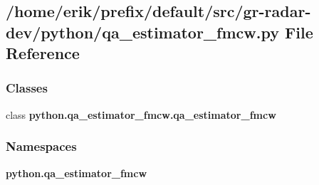 \subsection{/home/erik/prefix/default/src/gr-\/radar-\/dev/python/qa\+\_\+estimator\+\_\+fmcw.py File Reference}
\label{qa__estimator__fmcw_8py}
\subsubsection*{Classes}
\begin{DoxyCompactItemize}
\item 
class {\bf python.\+qa\+\_\+estimator\+\_\+fmcw.\+qa\+\_\+estimator\+\_\+fmcw}
\end{DoxyCompactItemize}
\subsubsection*{Namespaces}
\begin{DoxyCompactItemize}
\item 
 {\bf python.\+qa\+\_\+estimator\+\_\+fmcw}
\end{DoxyCompactItemize}
